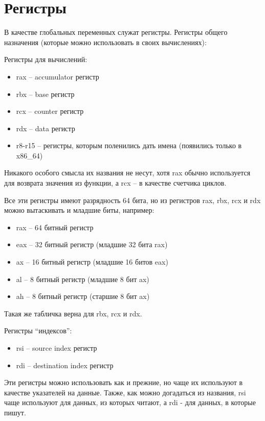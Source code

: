 \documentclass[a4paper,12pt]{article}
\begin{document}
\lstset{language=[x86masm]Assembler}
\lstset{frame=single}

\section{Регистры}

В качестве глобальных переменных служат регистры.
Регистры общего назначения (которые можно использовать в своих
вычислениях):

Регистры для вычислений:
\begin{itemize}
  \item rax -- accumulator регистр
  \item rbx -- base регистр
  \item rcx -- counter регистр
  \item rdx -- data регистр 
  \item r8-r15 -- регистры, которым поленились дать имена (появились
    только в x86\_64)
\end{itemize}

Никакого особого смысла их названия не несут, хотя rax обычно
используется для возврата значения из функции, а rcx -- в качестве
счетчика циклов.

Все эти регистры имеют разрядность 64 бита, но из регистров rax, rbx,
rcx и rdx можно вытаскивать и младшие биты, например:

\begin{itemize}
  \item rax -- 64 битный регистр
  \item eax -- 32 битный регистр (младшие 32 бита rax)
  \item ax -- 16 битный регистр (младшие 16 битов eax)
  \item al -- 8 битный регистр (младшие 8 бит ax)
  \item ah -- 8 битный регистр (старшие 8 бит ax)
\end{itemize}

Такая же табличка верна для rbx, rcx и rdx.

Регистры ``индексов'':
\begin{itemize}
  \item rsi -- source index регистр
  \item rdi -- destination index регистр
\end{itemize}

Эти регистры можно использовать как и прежние, но чаще их используют в
качестве указателей на данные. Также, как можно догадаться из
названия, rsi чаще используют для данных, из которых читают, а rdi - для данных,
в которые пишут.
\end{document}
